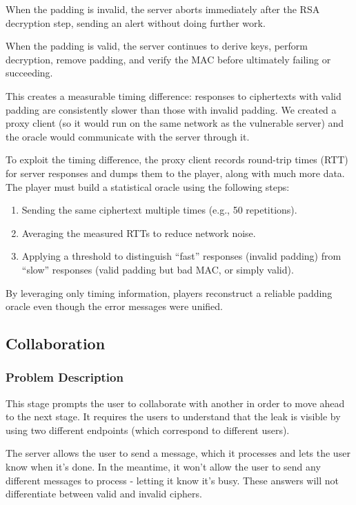 \documentclass[sigconf]{acmart}
\begin{document}
When the padding is invalid, the server aborts immediately after the RSA decryption step, sending an alert without doing further work.

When the padding is valid, the server continues to derive keys, perform decryption, remove padding, and verify the MAC before ultimately failing or succeeding.

This creates a measurable timing difference: responses to ciphertexts with valid padding are consistently slower than those with invalid padding.
We created a proxy client (so it would run on the same network as the vulnerable server) and the oracle would communicate with the server through it.

To exploit the timing difference, the proxy client records round-trip times (RTT) for server responses and dumps them to the player, along with much more data. The player must build a statistical oracle using the following steps:

\begin{enumerate}
    \item Sending the same ciphertext multiple times (e.g., 50 repetitions).
    \item Averaging the measured RTTs to reduce network noise.
    \item Applying a threshold to distinguish “fast” responses (invalid padding) from “slow” responses (valid padding but bad MAC, or simply valid).
\end{enumerate}

By leveraging only timing information, players reconstruct a reliable padding oracle even though the error messages were unified. 

\subsection{Collaboration}
\subsubsection{Problem Description}
This stage prompts the user to collaborate with another in order to move ahead to the next stage. It requires the users to understand that the leak is visible by using two different endpoints (which correspond to different users).

The server allows the user to send a message, which it processes and lets the user know when it’s done. In the meantime, it won’t allow the user to send any different messages to process - letting it know it’s busy. These answers will not differentiate between valid and invalid ciphers.
\end{document}
